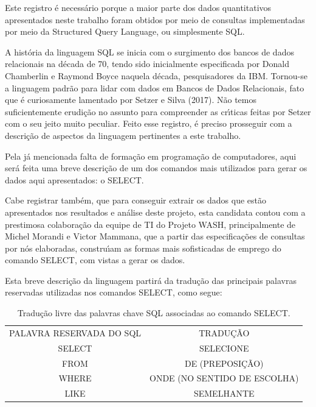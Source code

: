 \documentclass[
12pt,		%
openright,	%
twoside,  %
a4paper,			%
chapter=TITLE,		%
english,			%
french,				%
spanish,			%
brazil				%
]{USPSC-classe/USPSC}
\begin{document}
Este registro \'e necess\'ario porque a maior parte dos dados quantitativos apresentados neste trabalho foram obtidos por meio de consultas implementadas por meio da Structured Query Language, ou simplesmente SQL.


A hist\'oria da linguagem SQL se inicia com o surgimento dos bancos de dados relacionais na d\'ecada de 70, tendo sido inicialmente especificada por Donald Chamberlin e Raymond Boyce naquela d\'ecada, pesquisadores da IBM. Tornou-se a linguagem padr\~ao para lidar com dados em Bancos de Dados Relacionais, fato que \'e curiosamente lamentado por  Setzer e Silva (2017). N\~ao temos suficientemente erudi\c{c}\~ao no assunto para compreender as cr\'{\i}ticas feitas por Setzer com o seu jeito muito peculiar. Feito esse registro, \'e preciso prosseguir com a descri\c{c}\~ao de aspectos da linguagem pertinentes a este trabalho.


Pela j\'a mencionada falta de forma\c{c}\~ao em programa\c{c}\~ao de computadores, aqui ser\'a feita uma breve descri\c{c}\~ao de um dos comandos mais utilizados para gerar os dados aqui apresentados: o SELECT.


Cabe registrar tamb\'em, que para conseguir extrair os dados que est\~ao apresentados nos resultados e an\'alise deste projeto, esta candidata contou com a prestimosa colabora\c{c}\~ao da equipe de TI do Projeto WASH, principalmente de Michel Morandi e Victor Mammana, que a partir das especifica\c{c}\~oes de consultas por n\'os elaboradas, constru\'{\i}am as formas mais sofisticadas de emprego do comando SELECT, com vistas a gerar os dados.


Esta breve descri\c{c}\~ao da linguagem partir\'a da tradu\c{c}\~ao das principais palavras reservadas utilizadas nos comandos SELECT, como segue:






\begin{table}[htb]
\tiny
\caption{\label{83e82c686b7298dd0bc7475778644f6681053be7}Tradu\c{c}\~ao livre das palavras chave SQL associadas ao comando SELECT.}

\centering
\begin{tabular}{|c|c|}
\hline
PALAVRA RESERVADA DO SQL  &  TRADU\c{C}\~AO \\
SELECT  &  SELECIONE \\
FROM  &  DE (PREPOSI\c{C}\~AO) \\
WHERE  &  ONDE (NO SENTIDO DE ESCOLHA) \\
LIKE  &  SEMELHANTE \\
\hline
\end{tabular}
\end{table}
\end{document}
